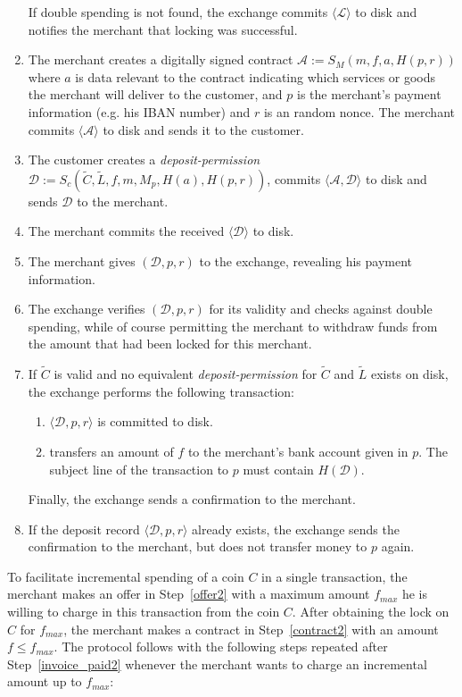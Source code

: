 \documentclass{llncs}
\begin{document}
\begin{enumerate}
  If double spending is not found,
  the exchange commits $\langle \mathcal{L} \rangle$ to disk
  and notifies the merchant that locking was successful.
\item\label{contract2} The merchant creates a digitally signed contract
  $\mathcal{A} := S_M(m, f, a, H(p, r))$ where $a$ is data relevant to the contract
  indicating which services or goods the merchant will deliver to the customer, and $p$ is the
  merchant's payment information (e.g. his IBAN number) and $r$ is an random nonce.
  The merchant commits $\langle \mathcal{A} \rangle$ to disk and sends it to the customer.
\item The customer creates a
  \emph{deposit-permission} $\mathcal{D} := S_c(\widetilde{C}, \widetilde{L}, f, m, M_p, H(a), H(p, r))$, commits
  $\langle \mathcal{A}, \mathcal{D} \rangle$ to disk and sends $\mathcal{D}$ to the merchant.
\item\label{invoice_paid2} The merchant commits the received $\langle \mathcal{D} \rangle$ to disk.
\item The merchant gives $(\mathcal{D}, p, r)$ to the exchange, revealing his
  payment information.
\item The exchange verifies $(\mathcal{D}, p, r)$ for its validity and
  checks against double spending, while of
  course permitting the merchant to withdraw funds from the amount that
  had been locked for this merchant.
 \item If $\widetilde{C}$ is valid and no equivalent \emph{deposit-permission} for $\widetilde{C}$ and $\widetilde{L}$ exists on disk, the
  exchange performs the following transaction:
  \begin{enumerate}
    \item $\langle \mathcal{D}, p, r \rangle$ is committed to disk.
    \item\label{transfer2} transfers an amount of $f$ to the merchant's bank account
      given in $p$.  The subject line of the transaction to $p$ must contain
      $H(\mathcal{D})$.
  \end{enumerate}
  Finally, the exchange sends a confirmation to the merchant.
 \item If the deposit record $\langle \mathcal{D}, p, r \rangle$ already exists,
  the exchange sends the confirmation to the merchant,
  but does not transfer money to $p$ again.
\end{enumerate}

To facilitate incremental spending of a coin $C$ in a single transaction, the
merchant makes an offer in Step~\ref{offer2} with a maximum amount $f_{max}$ he
is willing to charge in this transaction from the coin $C$.  After obtaining the
lock on $C$ for $f_{max}$, the merchant makes a contract in Step~\ref{contract2}
with an amount $f \leq f_{max}$.  The protocol follows with the following steps
repeated after Step~\ref{invoice_paid2} whenever the merchant wants to charge an
incremental amount up to $f_{max}$:
\end{document}
